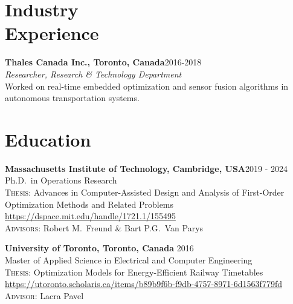 \documentclass[margin,line,pifont]{./FontsAndCls/custom_res}
\begin{document}
\begin{resume}

\section{\sc Industry \\ Experience}

{\textbf{Thales Canada Inc., Toronto, Canada}}\hfill 2016-2018  \\
\textit{Researcher,  Research \& Technology Department} \\
Worked on real-time embedded optimization and sensor fusion algorithms in autonomous transportation systems. 

\section{\sc Education}

 \textbf{Massachusetts Institute of Technology, Cambridge, USA}\hfill 2019 - 2024 \\
Ph.D.\ in Operations Research \\ 
\textsc{Thesis:} Advances in Computer-Assisted Design and Analysis of First-Order Optimization Methods and Related Problems \\
{}  \url{https://dspace.mit.edu/handle/1721.1/155495}\\
\textsc{Advisors:}   Robert M.\ Freund \&   Bart P.G.\ Van Parys 

\textbf{University of Toronto, Toronto, Canada} \hfill 2016\\
Master of Applied Science in Electrical and Computer Engineering \\
\textsc{Thesis:} Optimization Models for Energy-Efficient Railway Timetables \\
{}  \url{https://utoronto.scholaris.ca/items/b89b9f6b-f9db-4757-8971-6d1563f779fd}\\
\textsc{Advisor:}   Lacra Pavel






\end{resume}
\end{document}
